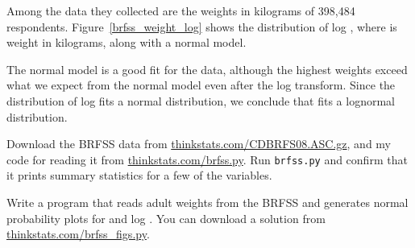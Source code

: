 \documentclass[12pt]{book}
\begin{document}
Among the data they collected are the weights in kilograms of
398,484 respondents.
Figure~\ref{brfss_weight_log} shows the distribution
of log \w, where \w is weight in kilograms, along with a normal
model.

The normal model is a good fit for the data, although the highest
weights exceed what we expect from the normal model even after the log
transform.  Since the distribution of log \w fits a normal distribution, we
conclude that \w fits a lognormal distribution.






\begin{exercise}
Download the BRFSS data from 
\url{thinkstats.com/CDBRFS08.ASC.gz}, and my code for reading it
from
\url{thinkstats.com/brfss.py}.  Run {\tt brfss.py} and confirm that
it prints summary statistics for a few of the variables.

Write a program that reads adult weights from the BRFSS and
generates normal probability plots for \w and log \w.  You can
download a solution from \url{thinkstats.com/brfss_figs.py}.

\end{exercise}
\end{document}
